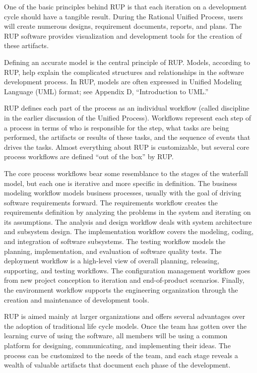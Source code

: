 One of the basic principles behind RUP is that each iteration on a development cycle should have a tangible result. During the Rational Unified Process, users will create numerous designs, requirement documents, reports, and plans. The RUP software provides visualization and development tools for the creation of these artifacts.


Defining an accurate model is the central principle of RUP. Models, according to RUP, help explain the complicated structures and relationships in the software development process. In RUP, models are often expressed in Unified Modeling Language (UML) format; see Appendix D, “Introduction to UML.”

RUP defines each part of the process as an individual workflow (called discipline in the earlier discussion of the Unified Process). Workflows represent each step of a process in terms of who is responsible for the step, what tasks are being performed, the artifacts or results of these tasks, and the sequence of events that drives the tasks. Almost everything about RUP is customizable, but several core process workflows are defined “out of the box” by RUP.

The core process workflows bear some resemblance to the stages of the waterfall model, but each one is iterative and more specific in definition. The business modeling workflow models business processes, usually with the goal of driving software requirements forward. The requirements workflow creates the requirements definition by analyzing the problems in the system and iterating on its assumptions. The analysis and design workflow deals with system architecture and subsystem design. The implementation workflow covers the modeling, coding, and integration of software subsystems. The testing workflow models the planning, implementation, and evaluation of software quality tests. The deployment workflow is a high-level view of overall planning, releasing, supporting, and testing workflows. The configuration management workflow goes from new project conception to iteration and end-of-product scenarios. Finally, the environment workflow supports the engineering organization through the creation and maintenance of development tools.


RUP is aimed mainly at larger organizations and offers several advantages over the adoption of traditional life cycle models. Once the team has gotten over the learning curve of using the software, all members will be using a common platform for designing, communicating, and implementing their ideas. The process can be customized to the needs of the team, and each stage reveals a wealth of valuable artifacts that document each phase of the development.

